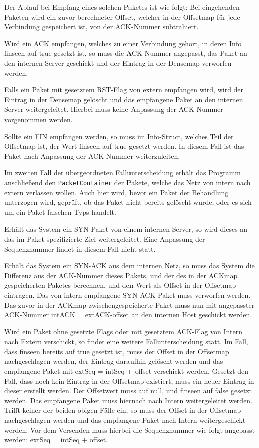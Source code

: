 \documentclass[../review_3.tex]{subfiles}
\begin{document}
Der Ablauf bei Empfang eines solchen Paketes ist wie folgt: Bei eingehenden Paketen wird ein zuvor berechneter Offset, welcher in der Offsetmap für jede Verbindung gespeichert ist, von der ACK-Nummer subtrahiert.

Wird ein ACK empfangen, welches zu einer Verbindung gehört, in deren Info finseen auf true gesetzt ist, so muss die ACK-Nummer angepasst, das Paket an den internen Server geschickt und der Eintrag in der Densemap verworfen werden.

Falls ein Paket mit gesetztem RST-Flag von extern empfangen wird, wird der Eintrag in der Densemap gelöscht und das empfangene Paket an den internen Server weitergeleitet. Hierbei muss keine Anpassung der ACK-Nummer vorgenommen werden.

Sollte ein FIN empfangen werden, so muss im Info-Struct, welches Teil der Offsetmap ist, der Wert finseen auf true gesetzt werden. In diesem Fall ist das Paket nach Anpassung der ACK-Nummer weiterzuleiten.

Im zweiten Fall der übergeordneten Fallunterscheidung erhält das Programm anschließend den \texttt{PacketContainer} der Pakete, welche das Netz von intern nach extern verlassen wollen. Auch hier wird, bevor ein Paket der Behandlung unterzogen wird, geprüft, ob das Paket nicht bereits gelöscht wurde, oder es sich um ein Paket falschen Typs handelt.

Erhält das System ein SYN-Paket von einem internen Server, so wird dieses an das im Paket spezifizierte Ziel weitergeleitet. Eine Anpassung der Sequenznummer findet in diesem Fall nicht statt.

Erhält das System ein SYN-ACK aus dem internen Netz, so muss das System die Differenz aus der ACK-Nummer dieses Pakets, und der des in der ACKmap gespeicherten Paketes berechnen, und den Wert als Offset in der Offsetmap eintragen. Das von intern empfangene SYN-ACK Paket muss verworfen werden.
Das zuvor in der ACKmap zwischengespeicherte Paket muss nun mit angepasster ACK-Nummer intACK = extACK-offset an den internen Host geschickt werden.

Wird ein Paket ohne gesetzte Flags oder mit gesetztem ACK-Flag von Intern nach Extern verschickt, so findet eine weitere Fallunterscheidung statt.
Im Fall, dass finseen bereits auf true gesetzt ist, muss der Offset in der Offsetmap nachgeschlagen werden, der Eintrag daraufhin gelöscht werden und das empfangene Paket mit extSeq = intSeq + offset verschickt werden.
Gesetzt den Fall, dass noch kein Eintrag in der Offsetmap existiert, muss ein neuer Eintrag in dieser erstellt werden. Der Offsetwert muss auf null, und finseen auf false gesetzt werden. Das empfangene Paket muss hiernach nach Intern weitergeleitet werden.
Trifft keiner der beiden obigen Fälle ein, so muss der Offset in der Offsetmap nachgeschlagen werden und das empfangene Paket nach Intern weitergeschickt werden. Vor dem Versenden muss hierbei die Sequenznummer wie folgt angepasst werden: extSeq = intSeq + offset.
\end{document}
